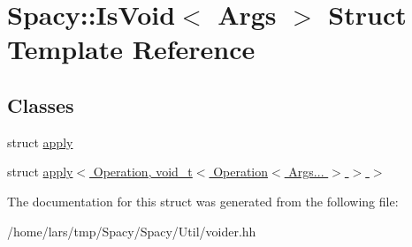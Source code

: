 \hypertarget{structSpacy_1_1IsVoid}{}\section{Spacy\+:\+:Is\+Void$<$ Args $>$ Struct Template Reference}
\label{structSpacy_1_1IsVoid}
\subsection*{Classes}
\begin{DoxyCompactItemize}
\item 
struct \hyperlink{structSpacy_1_1IsVoid_1_1apply}{apply}
\item 
struct \hyperlink{structSpacy_1_1IsVoid_1_1apply_3_01Operation_00_01void__t_3_01Operation_3_01Args_8_8_8_01_4_01_4_01_4}{apply$<$ Operation, void\+\_\+t$<$ Operation$<$ Args... $>$ $>$ $>$}
\end{DoxyCompactItemize}


The documentation for this struct was generated from the following file\+:\begin{DoxyCompactItemize}
\item 
/home/lars/tmp/\+Spacy/\+Spacy/\+Util/voider.\+hh\end{DoxyCompactItemize}
